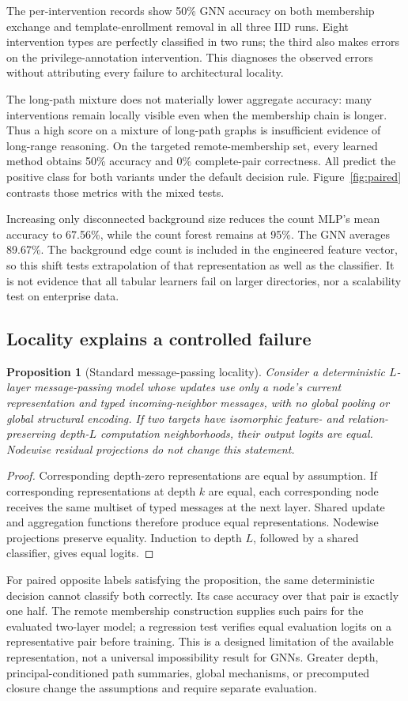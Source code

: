 \documentclass[journal]{IEEEtran}
\newtheorem{proposition}{Proposition}
\begin{document}
The per-intervention records show 50\% GNN accuracy on both membership exchange and template-enrollment removal in all three IID runs. Eight intervention types are perfectly classified in two runs; the third also makes errors on the privilege-annotation intervention. This diagnoses the observed errors without attributing every failure to architectural locality.

The long-path mixture does not materially lower aggregate accuracy: many interventions remain locally visible even when the membership chain is longer. Thus a high score on a mixture of long-path graphs is insufficient evidence of long-range reasoning. On the targeted remote-membership set, every learned method obtains 50\% accuracy and 0\% complete-pair correctness. All predict the positive class for both variants under the default decision rule. Figure~\ref{fig:paired} contrasts those metrics with the mixed tests.

Increasing only disconnected background size reduces the count MLP's mean accuracy to 67.56\%, while the count forest remains at 95\%. The GNN averages 89.67\%. The background edge count is included in the engineered feature vector, so this shift tests extrapolation of that representation as well as the classifier. It is not evidence that all tabular learners fail on larger directories, nor a scalability test on enterprise data.

\subsection{Locality explains a controlled failure}
\begin{proposition}[Standard message-passing locality]
Consider a deterministic $L$-layer message-passing model whose updates use only a node's current representation and typed incoming-neighbor messages, with no global pooling or global structural encoding. If two targets have isomorphic feature- and relation-preserving depth-$L$ computation neighborhoods, their output logits are equal. Nodewise residual projections do not change this statement.
\end{proposition}
\begin{proof}
Corresponding depth-zero representations are equal by assumption. If corresponding representations at depth $k$ are equal, each corresponding node receives the same multiset of typed messages at the next layer. Shared update and aggregation functions therefore produce equal representations. Nodewise projections preserve equality. Induction to depth $L$, followed by a shared classifier, gives equal logits.
\end{proof}
For paired opposite labels satisfying the proposition, the same deterministic decision cannot classify both correctly. Its case accuracy over that pair is exactly one half. The remote membership construction supplies such pairs for the evaluated two-layer model; a regression test verifies equal evaluation logits on a representative pair before training. This is a designed limitation of the available representation, not a universal impossibility result for GNNs. Greater depth, principal-conditioned path summaries, global mechanisms, or precomputed closure change the assumptions and require separate evaluation.
\end{document}
